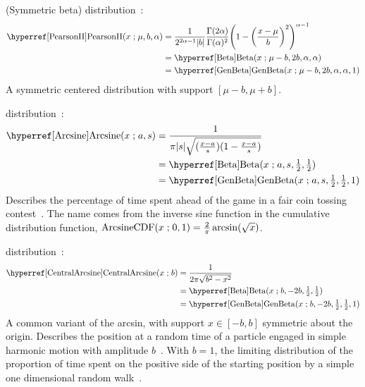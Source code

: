  (Symmetric beta) distribution~\cite{Pearson1895}: 
%
\begin{align}
\label{PearsonII}
\opr{PearsonII}(x\given \mu, b,\alpha) 
&= \frac{1}{2^{2\alpha-1}  |b|}\frac{\Gamma(2\alpha) }{ \Gamma(\alpha)^2 } \Left(1-\Left(\frac{x-\mu}{ b}\Right)^2 \Right)^{\alpha-1}
\checked
 \\
& = \opr{Beta}(x\given \mu-b, 2b,\alpha, \alpha) \notag  \\
\checked
& = \opr{GenBeta}(x\given \mu-b, 2 b ,\alpha, \alpha,1) \notag
\checked
\end{align}
A symmetric centered distribution with support $[\mu-b, \mu+b]$.



 distribution~\cite{Norton1975}:
\begin{align}
\label{Arcsine}
\opr{Arcsine}(x\given a, s) &= \frac{1}{\pi |s| \sqrt{(\tfrac{x-a}{s}) (1-\frac{x-a}{s} )}} \checked \\
& =\opr{Beta}(x\given a,s,   \tfrac{1}{2},  \tfrac{1}{2}) \notag \checked \\
& =\opr{GenBeta}(x\given a,s, \tfrac{1}{2}, \tfrac{1}{2},1) \notag \checked
\end{align}
Describes the percentage of time spent ahead of the game in a fair coin tossing contest~\cite{Johnson1995,Norton1975}. The name comes from the inverse sine function in the cumulative distribution function,
$
\operatorname{ArcsineCDF}(x\mathrel{;} 0,1) = \frac{2}{\pi} \operatorname{arcsin}( \sqrt{x}) 
$.



 
 distribution~\cite{Norton1975}: 
\begin{align}
\label{CentralArcsine}
\opr{CentralArcsine}(x\given b) &= \frac{1}{2 \pi  \sqrt{b^2-x^2}} \checked \\
& =\opr{Beta}(x\given b,-2b, \tfrac{1}{2}, \tfrac{1}{2})  \checked \notag \\
& =\opr{GenBeta}(x\given b,-2b, \tfrac{1}{2}, \tfrac{1}{2},1)  \checked \notag
\end{align}
A common variant of the arcsin, with support $x\in [-b,b]$ symmetric about the origin. Describes the position at a random time of a particle engaged in simple harmonic motion with amplitude $b$~\cite{Norton1975}. With $b=1$, the limiting distribution of the proportion of time spent on the positive side of the starting position by a simple one dimensional random walk~\cite{Feller1968}.


